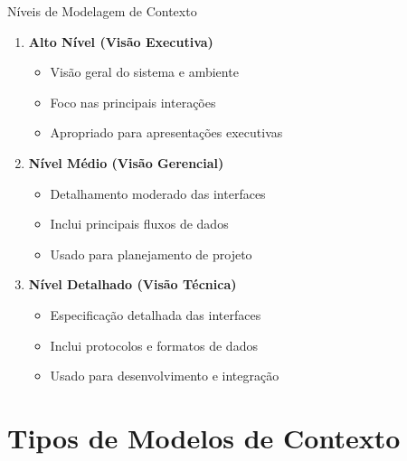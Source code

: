 \documentclass[aspectratio=169]{beamer}
\begin{document}
\begin{frame}{Níveis de Modelagem de Contexto}
\begin{enumerate}
\item \textbf{Alto Nível (Visão Executiva)}
\begin{itemize}
\item Visão geral do sistema e ambiente
\item Foco nas principais interações
\item Apropriado para apresentações executivas
\end{itemize}

\item \textbf{Nível Médio (Visão Gerencial)}
\begin{itemize}
\item Detalhamento moderado das interfaces
\item Inclui principais fluxos de dados
\item Usado para planejamento de projeto
\end{itemize}

\item \textbf{Nível Detalhado (Visão Técnica)}
\begin{itemize}
\item Especificação detalhada das interfaces
\item Inclui protocolos e formatos de dados
\item Usado para desenvolvimento e integração
\end{itemize}
\end{enumerate}
\end{frame}

\section{Tipos de Modelos de Contexto}
\end{document}
